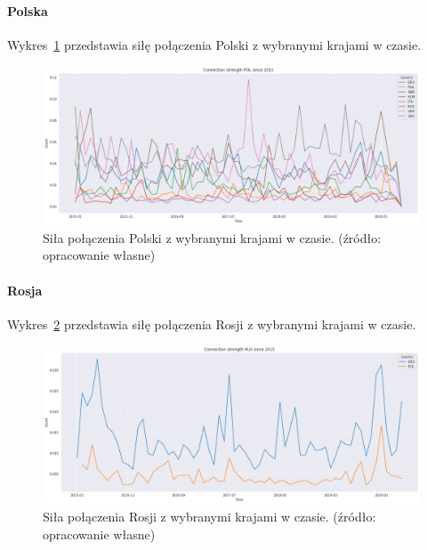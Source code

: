 \documentclass[11pt]{report}
\begin{document}
    \paragraph{Polska}

    Wykres~\ref{fig:PLConnection} przedstawia siłę połączenia Polski z wybranymi krajami w czasie.


    \begin{figure}[!htp]
        \centering
        \includegraphics[width=\linewidth]{fig/PL/POLConnection.png}
        \caption{Siła połączenia Polski z wybranymi krajami w czasie. (źródło: opracowanie własne)}
        \label{fig:PLConnection}
    \end{figure}

    \paragraph{Rosja}

    Wykres~\ref{fig:RUSConnection} przedstawia siłę połączenia Rosji z wybranymi krajami w czasie.

    \begin{figure}[!htp]
        \centering
        \includegraphics[width=\linewidth]{fig/RUS/RUSConnection.png}
        \caption{Siła połączenia Rosji z wybranymi krajami w czasie. (źródło: opracowanie własne)}
        \label{fig:RUSConnection}
    \end{figure}
\end{document}
